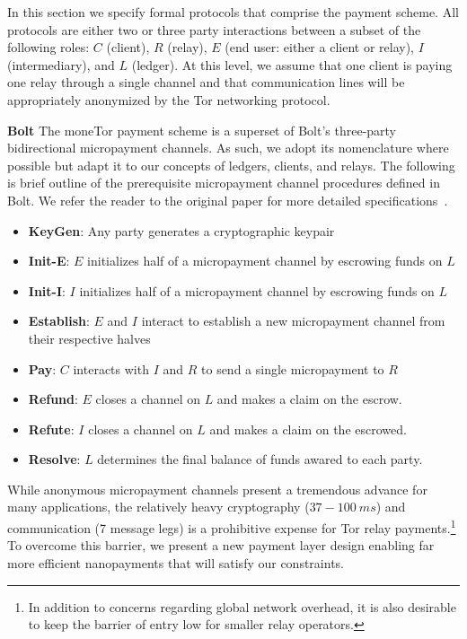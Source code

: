 In this section we specify formal protocols that comprise the payment
scheme. All protocols are either two or three party interactions between a
subset of the following roles: $C$ (client), $R$ (relay), $E$ (end user: either
a client or relay), $I$ (intermediary), and $L$ (ledger). At this level, we
assume that one client is paying one relay through a single channel and that
communication lines will be appropriately anonymized by the Tor networking
protocol.

\textbf{Bolt} The moneTor payment scheme is a superset of Bolt's three-party
bidirectional micropayment channels. As such, we adopt its nomenclature where
possible but adapt it to our concepts of ledgers, clients, and relays. The
following is brief outline of the prerequisite micropayment channel procedures
defined in Bolt. We refer the reader to the original paper for more detailed
specifications~\cite{green2017bolt}.

\begin{itemize}
\item \textbf{KeyGen}: Any party generates a cryptographic keypair
\item \textbf{Init-E}: $E$ initializes half of a micropayment channel by
  escrowing funds on $L$
\item \textbf{Init-I}: $I$ initializes half of a micropayment channel by
  escrowing funds on $L$
\item \textbf{Establish}: $E$ and $I$ interact to establish a new micropayment
  channel from their respective halves
\item \textbf{Pay}: $C$ interacts with $I$ and $R$ to send a single micropayment to $R$
\item \textbf{Refund}: $E$ closes a channel on $L$ and makes a claim on
  the escrow.
\item \textbf{Refute}: $I$ closes a channel on $L$ and makes a claim on
  the escrowed.
\item \textbf{Resolve}: $L$ determines the final balance of funds awared to
  each party.
\end{itemize}

While anonymous micropayment channels present a tremendous advance for many
applications, the relatively heavy cryptography ($37-100\ ms$) and communication
(7 message legs) is a prohibitive expense for Tor relay payments.\footnote{In addition to
concerns regarding global network overhead, it is also desirable to keep the
barrier of entry low for smaller relay operators.} To overcome this
barrier, we present a new payment layer design enabling far more efficient
nanopayments that will satisfy our constraints.

